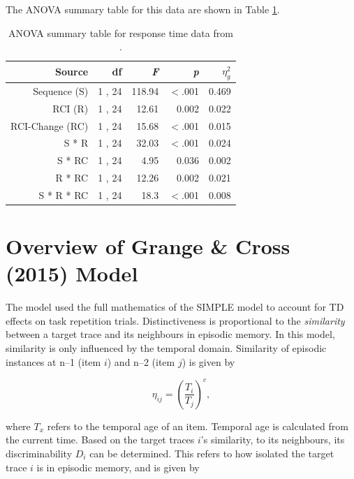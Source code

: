 \documentclass[a4paper, jou, natbib]{apa6}
\begin{document}
The ANOVA summary table for this data are shown in Table \ref{tab:grangeData}.

\begin{table}[htbp]
  \centering
  \caption{ANOVA summary table for response time data from \cite{Grangeinrevision}.}
    \begin{tabular}{rrrrr}
    \toprule
    Source & df    & \emph{F}     & \emph{p}     & $\eta_{g}^{2}$ \\
    \midrule
    Sequence (S) & 1 , 24 & 118.94 & $<$.001 & 0.469 \\
    RCI (R) & 1 , 24 & 12.61 & 0.002 & 0.022 \\
    RCI-Change (RC) & 1 , 24 & 15.68 & $<$.001 & 0.015 \\
    S * R & 1 , 24 & 32.03 & $<$.001 & 0.024 \\
    S * RC & 1 , 24 & 4.95  & 0.036 & 0.002 \\
    R * RC & 1 , 24 & 12.26 & 0.002 & 0.021 \\
    S * R * RC & 1 , 24 & 18.3  & $<$.001 & 0.008 \\
    \bottomrule
    \end{tabular}%
  \label{tab:grangeData}%
\end{table}%



\appendix
\section{Overview of Grange \& Cross (2015) Model}
The \cite{Grange2015} model used the full mathematics of the SIMPLE \citep{Brown2007} model to account for TD effects on task repetition trials. Distinctiveness is proportional to the \emph{similarity} between a target trace and its neighbours in episodic memory. In this model, similarity is only influenced by the temporal domain. Similarity of episodic instances at n--1 (item $i$) and n--2 (item $j$) is given by

\begin{equation}
\eta_{ij} = \left(\frac{T_{i}}{T_{j}}\right)^{c}, 
\label{eq:simpleSimilarity}
\end{equation}

\noindent where $T_{x}$ refers to the temporal age of an item. Temporal age is calculated from the current time. Based on the target traces $i$'s similarity, to its neighbours, its discriminability $D_{i}$ can be determined. This refers to how isolated the target trace $i$ is in episodic memory, and is given by
\end{document}
